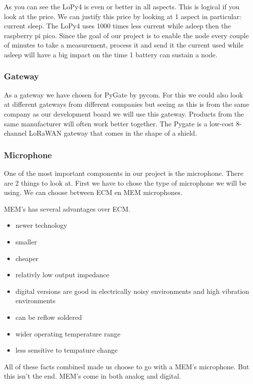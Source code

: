             As you can see the LoPy4 is even or better in all aspects. This is logical
            if you look at the price. We can justify this price by looking at 1 aspect
            in particular: current sleep. The LoPy4 uses 1000 times less current while asleep
            then the raspberry pi pico. Since the goal of our project is to enable the node
            every couple of minutes to take a measurement, process it and send it the current 
            used while asleep will have a big impact on the time 1 battery can sustain a node.
            
        \subsubsection{Gateway}
            As a gateway we have chosen for PyGate by pycom. For this we could also look at different gateways from different companies but seeing as this is from the same company as our development board we will use this gateway. Products from the same manufacturer will often work better together. 
            The Pygate is a low-cost 8-channel LoRaWAN gateway that comes in the shape of a shield.
    
        \subsubsection{Microphone} 
        
        One of the most important components in our project is the microphone.
        There are 2 things to look at. First we have to chose the type of microphone we will be using. We can choose between ECM en MEM microphones. 
        
        MEM's has several advantages over ECM.
        \begin{itemize}
            \item newer technology
            \item smaller
            \item cheaper
            \item relativly low output impedance
            \item digital versions are good in electrically noisy environments and high vibration environments
            \item can be reflow soldered
            \item wider operating temperature range
            \item less sensitive to tempature change
        \end{itemize}
        All of these facts combined made us choose to go with a MEM's microphone.
        But this isn't the end. MEM's come in both analog and digital. 
        
